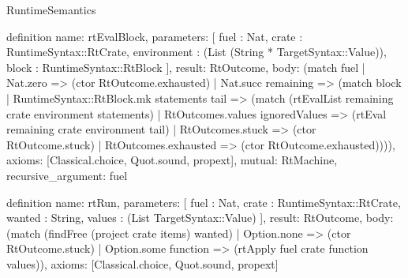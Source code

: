 \begin{lexlean}{RuntimeSemantics}
\begin{semanticmodule}
definition{
  name: rtEvalBlock,
  parameters: [
    fuel : Nat,
    crate : RuntimeSyntax::RtCrate,
    environment : (List (String * TargetSyntax::Value)),
    block : RuntimeSyntax::RtBlock
  ],
  result: RtOutcome,
  body: (match fuel
    | Nat.zero => (ctor RtOutcome.exhausted)
    | Nat.succ remaining => (match block
      | RuntimeSyntax::RtBlock.mk statements tail => (match (rtEvalList remaining crate environment statements)
        | RtOutcomes.values ignoredValues => (rtEval remaining crate environment tail)
        | RtOutcomes.stuck => (ctor RtOutcome.stuck)
        | RtOutcomes.exhausted => (ctor RtOutcome.exhausted)))),
  axioms: [Classical.choice, Quot.sound, propext],
  mutual: RtMachine,
  recursive_argument: fuel
}

definition{
  name: rtRun,
  parameters: [
    fuel : Nat,
    crate : RuntimeSyntax::RtCrate,
    wanted : String,
    values : (List TargetSyntax::Value)
  ],
  result: RtOutcome,
  body: (match (findFree (project crate items) wanted)
    | Option.none => (ctor RtOutcome.stuck)
    | Option.some function => (rtApply fuel crate function values)),
  axioms: [Classical.choice, Quot.sound, propext]
}
\end{semanticmodule}
\end{lexlean}
